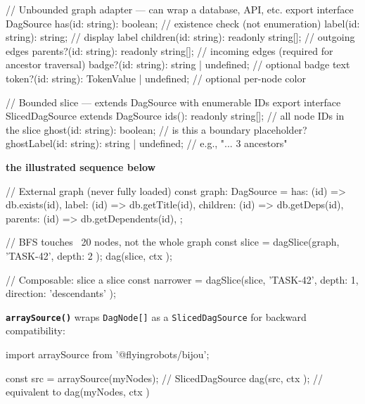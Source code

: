 \begin{CodeBlock}
// Unbounded graph adapter — can wrap a database, API, etc.
export interface DagSource {
  has(id: string): boolean;                   // existence check (not enumeration)
  label(id: string): string;                  // display label
  children(id: string): readonly string[];    // outgoing edges
  parents?(id: string): readonly string[];    // incoming edges (required for ancestor traversal)
  badge?(id: string): string | undefined;     // optional badge text
  token?(id: string): TokenValue | undefined; // optional per-node color
}

// Bounded slice — extends DagSource with enumerable IDs
export interface SlicedDagSource extends DagSource {
  ids(): readonly string[];                   // all node IDs in the slice
  ghost(id: string): boolean;                 // is this a boundary placeholder?
  ghostLabel(id: string): string | undefined; // e.g., "... 3 ancestors"
}
\end{CodeBlock}

\textbf{the illustrated sequence below}





\begin{CodeBlock}
// External graph (never fully loaded)
const graph: DagSource = {
  has: (id) => db.exists(id),
  label: (id) => db.getTitle(id),
  children: (id) => db.getDeps(id),
  parents: (id) => db.getDependents(id),
};

// BFS touches ~20 nodes, not the whole graph
const slice = dagSlice(graph, 'TASK-42', { depth: 2 });
dag(slice, { ctx });

// Composable: slice a slice
const narrower = dagSlice(slice, 'TASK-42', { depth: 1, direction: 'descendants' });
\end{CodeBlock}

\textbf{\texttt{a\allowbreak{}r\allowbreak{}r\allowbreak{}a\allowbreak{}y\allowbreak{}S\allowbreak{}o\allowbreak{}u\allowbreak{}r\allowbreak{}c\allowbreak{}e\allowbreak{}(\allowbreak{})}} wraps \texttt{D\allowbreak{}a\allowbreak{}g\allowbreak{}N\allowbreak{}o\allowbreak{}d\allowbreak{}e\allowbreak{}[\allowbreak{}]} as a \texttt{S\allowbreak{}l\allowbreak{}i\allowbreak{}c\allowbreak{}e\allowbreak{}d\allowbreak{}D\allowbreak{}a\allowbreak{}g\allowbreak{}S\allowbreak{}o\allowbreak{}u\allowbreak{}r\allowbreak{}c\allowbreak{}e} for backward compatibility:

\begin{CodeBlock}
import { arraySource } from '@flyingrobots/bijou';

const src = arraySource(myNodes);  // SlicedDagSource
dag(src, { ctx });                 // equivalent to dag(myNodes, { ctx })
\end{CodeBlock}

